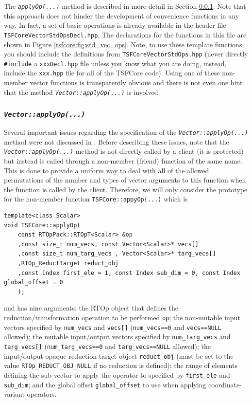 The \texttt{\textit{applyOp(\-...)}}  method is described in more detail
in Section \ref{tsfcore:sec:vec_apply_op}.  Note that this approach
does not hinder the development of convenience functions in any way.
In fact, a set of basic operations is already available in the header
file \texttt{TSFCore\-Vector\-Std\-Ops\-Decl.hpp}.  The declarations for the
functions in this file are shown in Figure
\ref{tsfcore:fig:std_vec_ops}.  Note, to use these template functions
you should include the definitions from
\texttt{TSFCore\-Vector\-Std\-Ops.hpp} (never directly \texttt{\#include} a
\texttt{xxxDecl.hpp} file unless you know what you
are doing, instead, include the \texttt{xxx.hpp} file for all of the
TSFCore code).  Using one of these non-member vector functions is
transparently obvious and there is not even one hint that the method
\texttt{\textit{Vector::applyOp(\-...)}} is involved.

%
\subsubsection{\texttt{\textit{Vector::applyOp(\-...)}}}
\label{tsfcore:sec:vec_apply_op}
%

Several important issues regarding the specification of the
\texttt{\textit{Vector::applyOp(\-...)}} method were not discussed in
\cite{ref:rtop_toms}.  Before describing these issues, note that the
\texttt{\textit{Vector\-::applyOp(\-...)}} method is not directly called
by a client (it is protected) but instead is called through a
non-member (friend) function of the same name.  This is done to
provide a uniform way to deal with all of the allowed permutations of
the number and types of vector arguments to this function when the
function is called by the client.  Therefore, we will only consider
the prototype for the non-member function
\texttt{TSFCore::appyOp(...)}  which is

{\scriptsize\begin{verbatim}
template<class Scalar>
void TSFCore::applyOp(
    const RTOpPack::RTOpT<Scalar> &op
    ,const size_t num_vecs, const Vector<Scalar>* vecs[]
    ,const size_t num_targ_vecs , Vector<Scalar>* targ_vecs[]
    ,RTOp_ReductTarget reduct_obj
    ,const Index first_ele = 1, const Index sub_dim = 0, const Index global_offset = 0
    );
\end{verbatim}}

\noindent and has nine arguments: the RTOp object that defines the
reduction/transformation operation to be performed \texttt{op}; the
non-mutable input vectors specified by \texttt{num\_vecs} and
\texttt{vecs[]} (\texttt{num\_vecs==0} and \texttt{vecs==NULL}
allowed); the mutable input/output vectors specified by
\texttt{num\_targ\_vecs} and \texttt{targ\-\_vecs[]}
(\texttt{num\_targ\_vecs==0} and \texttt{targ\_vecs==NULL} allowed);
the input/output opaque reduction target object \texttt{reduct\_obj}
(must be set to the value \texttt{RTOp\_REDUCT\_OBJ\_NULL} if no
reduction is defined); the range of elements defining the sub-vector
to apply the operator to specified by \texttt{first\_ele} and
\texttt{sub\_dim}; and the global offset \texttt{global\_offset} to
use when applying coordinate-variant operators.

